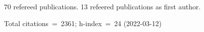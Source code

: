 70 refereed publications. 13 refeered publications as first author.

Total citations~=~2361; h-index~=~24 (2022-03-12)